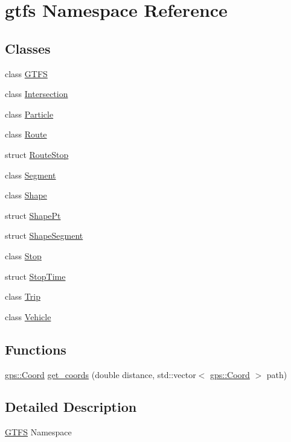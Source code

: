 \hypertarget{namespacegtfs}{}\section{gtfs Namespace Reference}
\label{namespacegtfs}
\subsection*{Classes}
\begin{DoxyCompactItemize}
\item 
class \hyperlink{classgtfs_1_1GTFS}{G\+T\+FS}
\item 
class \hyperlink{classgtfs_1_1Intersection}{Intersection}
\item 
class \hyperlink{classgtfs_1_1Particle}{Particle}
\item 
class \hyperlink{classgtfs_1_1Route}{Route}
\item 
struct \hyperlink{structgtfs_1_1RouteStop}{Route\+Stop}
\item 
class \hyperlink{classgtfs_1_1Segment}{Segment}
\item 
class \hyperlink{classgtfs_1_1Shape}{Shape}
\item 
struct \hyperlink{structgtfs_1_1ShapePt}{Shape\+Pt}
\item 
struct \hyperlink{structgtfs_1_1ShapeSegment}{Shape\+Segment}
\item 
class \hyperlink{classgtfs_1_1Stop}{Stop}
\item 
struct \hyperlink{structgtfs_1_1StopTime}{Stop\+Time}
\item 
class \hyperlink{classgtfs_1_1Trip}{Trip}
\item 
class \hyperlink{classgtfs_1_1Vehicle}{Vehicle}
\end{DoxyCompactItemize}
\subsection*{Functions}
\begin{DoxyCompactItemize}
\item 
\hyperlink{classgps_1_1Coord}{gps\+::\+Coord} \hyperlink{namespacegtfs_aab5513b6c15b5c30de5f706a2e587ae4}{get\+\_\+coords} (double distance, std\+::vector$<$ \hyperlink{classgps_1_1Coord}{gps\+::\+Coord} $>$ path)
\end{DoxyCompactItemize}


\subsection{Detailed Description}
\hyperlink{classgtfs_1_1GTFS}{G\+T\+FS} Namespace

